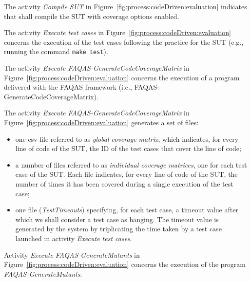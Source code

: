 The activity \emph{Compile SUT} in Figure~\ref{fig:process:codeDriven:evaluation} indicates that \MASS shall compile the SUT with coverage options enabled.



The activity \emph{Execute test cases} in Figure~\ref{fig:process:codeDriven:evaluation} concerns the execution of the test cases following the practice for the SUT (e.g., running the command \texttt{make test}).

The activity \emph{Execute FAQAS-GenerateCodeCoverageMatrix} in Figure~\ref{fig:process:codeDriven:evaluation} concerns the execution of a program delivered with the FAQAS framework (i.e., FAQAS-GenerateCodeCoverageMatrix).


The activity \emph{Execute FAQAS-GenerateCodeCoverageMatrix} in Figure~\ref{fig:process:codeDriven:evaluation} generates a set of files:
\begin{itemize}
\item one csv file referred to as \emph{global coverage matrix}, which indicates, for every line of code of the SUT, the ID of the test cases that cover the line of code;
\item a number of files  referred to as \emph{individual coverage matrices}, one for each test case of the SUT. Each file indicates, for every line of code of the SUT, the number of times it has been covered during a single execution of the test case;
\item one file (\emph{TestTimeouts}) specifying, for each test case, a timeout value after which we shall consider a test case as hanging. The timeout value is generated by the system by triplicating the time taken by a test case launched in activity \emph{Execute test cases}.
\end{itemize}

Activity \emph{Execute FAQAS-GenerateMutants} in Figure~\ref{fig:process:codeDriven:evaluation} concerns the execution of the program \emph{FAQAS-GenerateMutants}.

